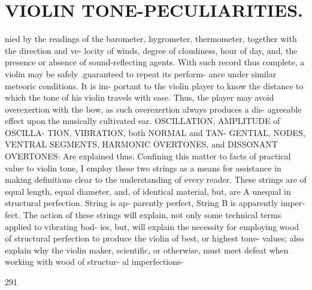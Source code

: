 \documentclass{article}
\begin{document}
\section*{VIOLIN TONE-PECULIARITIES.}
nied by the readings of the barometer, hygrometer, thermometer, together with the direction and ve- locity of winds, degree of cloudiness, hour of day, and, the presence or absence of sound-reflecting agents. With such record thus complete, a violin may be safely .guaranteed to repeat its perform- ance under similar meteoric conditions. It is im- portant to the violin player to know the distance to which the tone of his violin travels with ease. Thus, the player may avoid overexertion with the bow, as such overexertion always produces a dis- agreeable effect upon the musically cultivated ear. OSCILLATION, AMPLITUDE of OSCILLA- TION, VIBRATION, both NORMAL and TAN- GENTIAL, NODES, VENTRAL SEGMENTS, HARMONIC OVERTONES, and DISSONANT OVERTONES: Are explained thus: Confining this matter to facts of practical value to violin tone, I employ these two strings as a means for assistance in making definitions clear to the understanding of every reader. These strings are of equal length, equal diameter, and, of identical material, but, are A unequal in structural perfection. String is ap- parently perfect, String B is apparently imper- fect. The action of these strings will explain, not only some technical terms applied to vibrating bod- ies, but, will explain the necessity for employing wood of structural perfection to produce the violin of best, or highest tone- values; also explain why the violin maker, scientific, or otherwise, must meet defeat when working with wood of structur- al imperfections-

291
\end{document}
